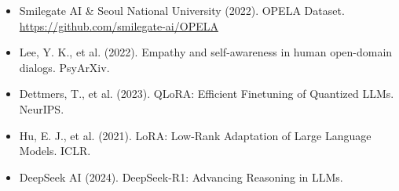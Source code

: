 \documentclass[11pt, a4paper]{article}
\begin{document}
\begin{itemize}
    \item Smilegate AI \& Seoul National University (2022). OPELA Dataset. \url{https://github.com/smilegate-ai/OPELA}
    \item Lee, Y. K., et al. (2022). Empathy and self-awareness in human open-domain dialogs. PsyArXiv.
    \item Dettmers, T., et al. (2023). QLoRA: Efficient Finetuning of Quantized LLMs. NeurIPS.
    \item Hu, E. J., et al. (2021). LoRA: Low-Rank Adaptation of Large Language Models. ICLR.
    \item DeepSeek AI (2024). DeepSeek-R1: Advancing Reasoning in LLMs.
\end{itemize}
\end{document}
